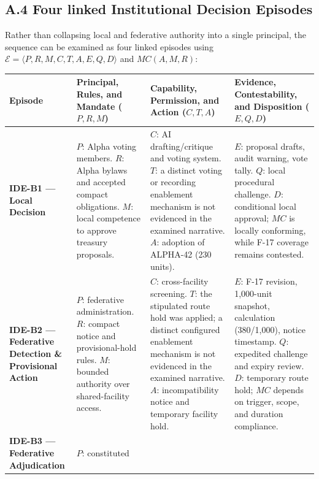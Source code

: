 \documentclass[
  10pt,
]{article}
\newcounter{none} %
\begin{document}
\subsection{A.4 Four linked Institutional Decision
Episodes}\label{a.4-four-linked-institutional-decision-episodes}

Rather than collapsing local and federative authority into a single
principal, the sequence can be examined as four linked episodes using
\(\mathcal{E}=\langle P,R,M,C,T,A,E,Q,D\rangle\) and \(MC(A,M,R)\):

{\def\LTcaptype{none} %
\setlength{\parskip}{0pt}\begin{longtable}[]{@{}
  >{\raggedright\arraybackslash}p{}
  >{\raggedright\arraybackslash}p{}
  >{\raggedright\arraybackslash}p{}
  >{\raggedright\arraybackslash}p{}@{}}
\toprule\noalign{}
Episode & Principal, Rules, and Mandate (\(P,R,M\)) & Capability, Permission, and Action (\(C,T,A\)) & Evidence, Contestability, and Disposition (\(E,Q,D\)) \\
\midrule\noalign{}
\endhead
\bottomrule\noalign{}
\endlastfoot
\textbf{IDE-B1 --- Local Decision} & \(P\): Alpha voting members. \(R\):
Alpha bylaws and accepted compact obligations. \(M\): local competence
to approve treasury proposals. & \(C\): AI drafting/critique and voting
system. \(T\): a distinct voting or recording enablement mechanism is
not evidenced in the examined narrative. \(A\): adoption of ALPHA-42
(230 units). & \(E\): proposal drafts, audit warning, vote tally. \(Q\):
local procedural challenge. \(D\): conditional local approval; \(MC\) is
locally conforming, while F-17 coverage remains contested. \\
\textbf{IDE-B2 --- Federative Detection \& Provisional Action} & \(P\):
federative administration. \(R\): compact notice and provisional-hold
rules. \(M\): bounded authority over shared-facility access. & \(C\):
cross-facility screening. \(T\): the stipulated route hold was applied;
a distinct configured enablement mechanism is not evidenced in the
examined narrative. \(A\): incompatibility notice and temporary facility
hold. & \(E\): F-17 revision, 1,000-unit snapshot, calculation
(380/1,000), notice timestamp. \(Q\): expedited challenge and expiry
review. \(D\): temporary route hold; \(MC\) depends on trigger, scope,
and duration compliance. \\
\textbf{IDE-B3 --- Federative Adjudication} & \(P\): constituted

\end{longtable}}
\end{document}
